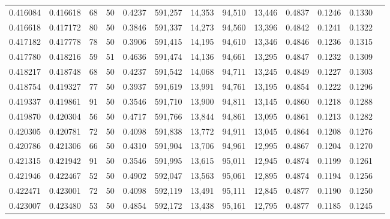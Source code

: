 \begin{tabular}{rrrrrrrrrrrrr}
0.416084 & 0.416618 &    68 &  50 &                                     0.4237 & 591,257 &  14,353 &  94,510 &  13,446 & 0.4837 & 0.1246 & 0.1330 \\
0.416618 & 0.417172 &    80 &  50 &                                     0.3846 & 591,337 &  14,273 &  94,560 &  13,396 & 0.4842 & 0.1241 & 0.1322 \\
0.417182 & 0.417778 &    78 &  50 &                                     0.3906 & 591,415 &  14,195 &  94,610 &  13,346 & 0.4846 & 0.1236 & 0.1315 \\
0.417780 & 0.418216 &    59 &  51 &                                     0.4636 & 591,474 &  14,136 &  94,661 &  13,295 & 0.4847 & 0.1232 & 0.1309 \\
0.418217 & 0.418748 &    68 &  50 &                                     0.4237 & 591,542 &  14,068 &  94,711 &  13,245 & 0.4849 & 0.1227 & 0.1303 \\
0.418754 & 0.419327 &    77 &  50 &                                     0.3937 & 591,619 &  13,991 &  94,761 &  13,195 & 0.4854 & 0.1222 & 0.1296 \\
0.419337 & 0.419861 &    91 &  50 &                                     0.3546 & 591,710 &  13,900 &  94,811 &  13,145 & 0.4860 & 0.1218 & 0.1288 \\
0.419870 & 0.420304 &    56 &  50 &                                     0.4717 & 591,766 &  13,844 &  94,861 &  13,095 & 0.4861 & 0.1213 & 0.1282 \\
0.420305 & 0.420781 &    72 &  50 &                                     0.4098 & 591,838 &  13,772 &  94,911 &  13,045 & 0.4864 & 0.1208 & 0.1276 \\
0.420786 & 0.421306 &    66 &  50 &                                     0.4310 & 591,904 &  13,706 &  94,961 &  12,995 & 0.4867 & 0.1204 & 0.1270 \\
0.421315 & 0.421942 &    91 &  50 &                                     0.3546 & 591,995 &  13,615 &  95,011 &  12,945 & 0.4874 & 0.1199 & 0.1261 \\
0.421946 & 0.422467 &    52 &  50 &                                     0.4902 & 592,047 &  13,563 &  95,061 &  12,895 & 0.4874 & 0.1194 & 0.1256 \\
0.422471 & 0.423001 &    72 &  50 &                                     0.4098 & 592,119 &  13,491 &  95,111 &  12,845 & 0.4877 & 0.1190 & 0.1250 \\
0.423007 & 0.423480 &    53 &  50 &                                     0.4854 & 592,172 &  13,438 &  95,161 &  12,795 & 0.4877 & 0.1185 & 0.1245 \\

\end{tabular}
